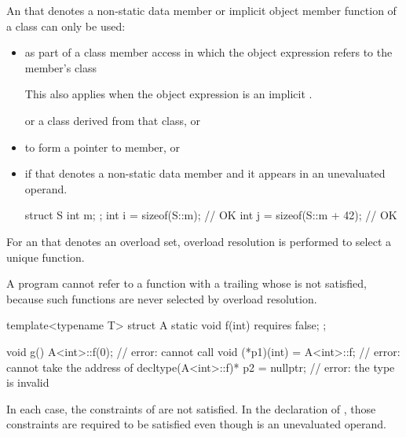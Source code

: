 \pnum
An  that denotes a non-static data member or
implicit object member function of a class can only be used:
\begin{itemize}
\item as part of a class member access in which the
object expression
refers to the member's class
\begin{footnote}
This also applies when the object expression
is an implicit .
\end{footnote}
or a class derived from
that class, or

\item to form a pointer to member, or

\item if that  denotes a non-static data member
and it appears in an unevaluated operand.
\begin{example}
\begin{codeblock}
struct S {
  int m;
};
int i = sizeof(S::m);           // OK
int j = sizeof(S::m + 42);      // OK
\end{codeblock}
\end{example}
\end{itemize}

\pnum
For an  that denotes an overload set,
overload resolution is performed
to select a unique function.
\begin{note}
A program cannot refer to a function
with a trailing 
whose  is not satisfied,
because such functions are never selected by overload resolution.
\begin{example}
\begin{codeblock}
template<typename T> struct A {
  static void f(int) requires false;
};

void g() {
  A<int>::f(0);                         // error: cannot call 
  void (*p1)(int) = A<int>::f;          // error: cannot take the address of 
  decltype(A<int>::f)* p2 = nullptr;    // error: the type  is invalid
}
\end{codeblock}
In each case, the constraints of  are not satisfied.
In the declaration of ,
those constraints are required to be satisfied
even though
 is an unevaluated operand.
\end{example}
\end{note}

